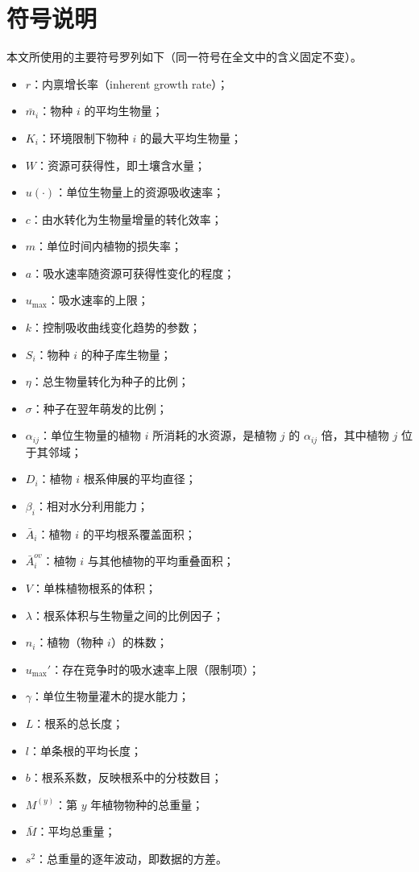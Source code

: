 \documentclass[11pt,a4paper]{ctexart}
\begin{document}
\section{符号说明}

本文所使用的主要符号罗列如下（同一符号在全文中的含义固定不变）。

\begin{itemize}
\item $r$：内禀增长率（inherent growth rate）；
\item $\bar m_i$：物种 $i$ 的平均生物量；
\item $K_i$：环境限制下物种 $i$ 的最大平均生物量；
\item $W$：资源可获得性，即土壤含水量；
\item $u(\cdot)$：单位生物量上的资源吸收速率；
\item $c$：由水转化为生物量增量的转化效率；
\item $m$：单位时间内植物的损失率；
\item $a$：吸水速率随资源可获得性变化的程度；
\item $u_{\max}$：吸水速率的上限；
\item $k$：控制吸收曲线变化趋势的参数；
\item $S_i$：物种 $i$ 的种子库生物量；
\item $\eta$：总生物量转化为种子的比例；
\item $\sigma$：种子在翌年萌发的比例；
\item $\alpha_{ij}$：单位生物量的植物 $i$ 所消耗的水资源，是植物 $j$ 的 $\alpha_{ij}$ 倍，其中植物 $j$ 位于其邻域；
\item $D_i$：植物 $i$ 根系伸展的平均直径；
\item $\beta_i$：相对水分利用能力；
\item $\bar A_i$：植物 $i$ 的平均根系覆盖面积；
\item $\bar A_i^{ov}$：植物 $i$ 与其他植物的平均重叠面积；
\item $V$：单株植物根系的体积；
\item $\lambda$：根系体积与生物量之间的比例因子；
\item $n_i$：植物（物种 $i$）的株数；
\item $u_{\max}'$：存在竞争时的吸水速率上限（限制项）；
\item $\gamma$：单位生物量灌木的提水能力；
\item $L$：根系的总长度；
\item $l$：单条根的平均长度；
\item $b$：根系系数，反映根系中的分枝数目；
\item $M^{(y)}$：第 $y$ 年植物物种的总重量；
\item $\bar M$：平均总重量；
\item $s^{2}$：总重量的逐年波动，即数据的方差。
\end{itemize}
\end{document}
